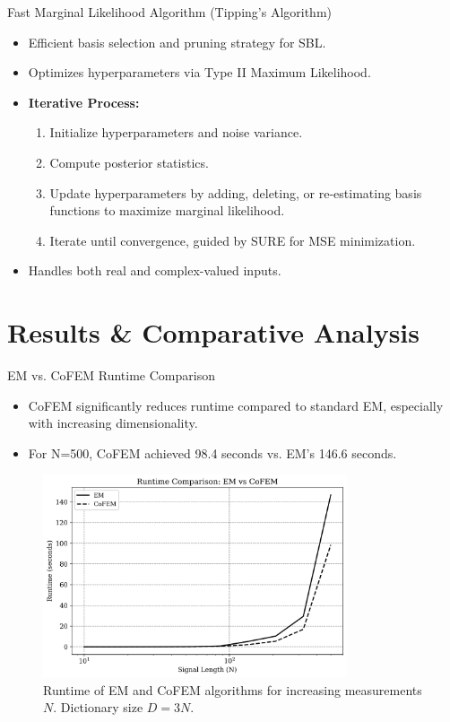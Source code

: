 \documentclass{beamer}
\begin{document}
\begin{frame}{Fast Marginal Likelihood Algorithm (Tipping's Algorithm)}
    \begin{itemize}
        \item Efficient basis selection and pruning strategy for SBL. 
        \item Optimizes hyperparameters via Type II Maximum Likelihood. 
        \item \textbf{Iterative Process:}
            \begin{enumerate}
                \item Initialize hyperparameters and noise variance. 
                \item Compute posterior statistics. 
                \item Update hyperparameters by adding, deleting, or re-estimating basis functions to maximize marginal likelihood. 
                \item Iterate until convergence, guided by SURE for MSE minimization. 
            \end{enumerate}
        \item Handles both real and complex-valued inputs. 
    \end{itemize}
\end{frame}

\section{Results & Comparative Analysis}
\begin{frame}{EM vs. CoFEM Runtime Comparison}
    \begin{itemize}
        \item CoFEM significantly reduces runtime compared to standard EM, especially with increasing dimensionality. 
        \item For N=500, CoFEM achieved 98.4 seconds vs. EM's 146.6 seconds. 
    \end{itemize}
    \begin{figure}[h!]
        \centering
        \includegraphics[width=0.8\textwidth]{Figures/runtime_comp.png}
        \caption{Runtime of EM and CoFEM algorithms for increasing measurements $N$. Dictionary size $D=3N$. }
    \end{figure}
\end{frame}
\end{document}
